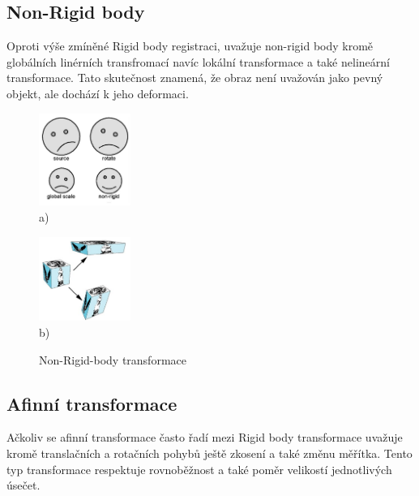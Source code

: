 \documentclass{thesis}%
\begin{document}
\subsection{Non-Rigid body}
Oproti výše zmíněné Rigid body registraci, uvažuje non-rigid body kromě globálních linérních transfromací navíc lokální transformace a také nelineární transformace. Tato skutečnost znamená, že obraz není uvažován jako pevný objekt, ale dochází k jeho deformaci. 
 \begin{figure}[htp!]
  \begin{minipage}[c]{0.5\textwidth}
     \centering\includegraphics[width=3cm]{nonrigid.png}\\
     a)
   \end{minipage}
  \begin{minipage}[c]{0.5\textwidth}
     \centering\includegraphics[width=3cm]{nonrigid2.png}\\
     b)
   \end{minipage}
   
      \caption[Non-Rigid-body transformace]{Non-Rigid-body transformace}
\end{figure}
\newpage
\subsection{Afinní transformace}
Ačkoliv se afinní transformace často řadí mezi Rigid body transformace uvažuje kromě translačních a rotačních pohybů ještě zkosení a také změnu měřítka. Tento typ transformace respektuje rovnoběžnost a také poměr velikostí jednotlivých úsečet.
\end{document}
